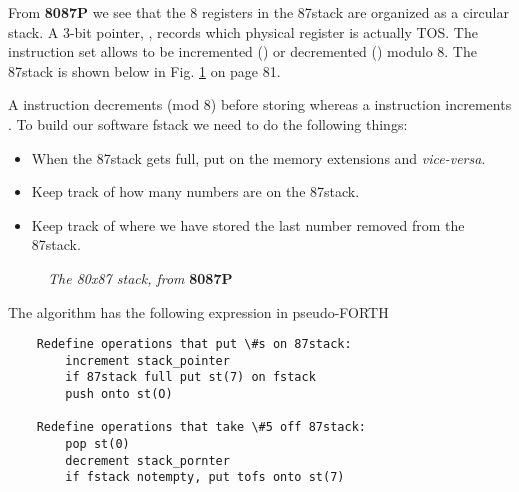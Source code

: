 From \textbf{8087P} we see that the 8 registers in the 87stack are organized as a circular stack. A 3-bit pointer, , records which physical register is actually TOS. The instruction set allows  to be incremented () or decremented () modulo 8. The 87stack is shown below in Fig. \ref{fig:04_01} on page 81.

A  instruction decrements  (mod 8) before storing whereas a  instruction increments . To build our software fstack we need to do the following things:
\begin{itemize}
    \item When the 87stack gets full, put  on the memory extensions and \textit{vice-versa}.
    \item Keep track of how many numbers are on the 87stack.
    \item Keep track of where we have stored the last number removed from the 87stack.
\end{itemize}

\begin{figure}
    \center
    \caption{\textit{The 80x87 stack, from} \textbf{8087P}}
    \label{fig:04_01}
\end{figure}

The algorithm has the following expression in pseudo-FORTH

\begin{lstlisting}
    Redefine operations that put \#s on 87stack:
        increment stack_pointer
        if 87stack full put st(7) on fstack
        push onto st(O)

    Redefine operations that take \#5 off 87stack:
        pop st(0)
        decrement stack_pornter
        if fstack notempty, put tofs onto st(7)
\end{lstlisting}

